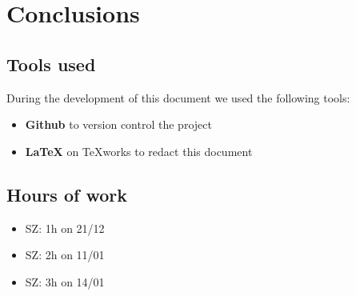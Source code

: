 \documentclass[11pt]{article} %
\begin{document}
\newpage
\section{Conclusions}

\subsection{Tools used}
During the development of this document we used the following tools:
\begin{itemize}
	\item \textbf{Github} to version control the project
	\item \textbf{\LaTeX} on TeXworks to redact this document
\end{itemize}

\subsection{Hours of work}
\begin{itemize}
	\item SZ: 1h on 21/12
	\item SZ: 2h on 11/01
	\item SZ: 3h on 14/01
\end{itemize}
\end{document}
